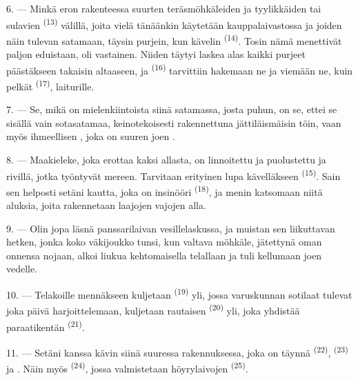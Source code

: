 6. --- Minkä eron rakenteessa suurten teräsmöhkäleiden ja tyylikkäiden
 tai sulavien 
\textsuperscript{(13)} välillä, joita vielä tänäänkin käytetään
kauppalaivastossa ja joiden näin tulevan satamaan, täysin purjein, kun kävelin
 \textsuperscript{(14)}. Tosin nämä menettivät paljon
eduistaan,   oli vastainen. Niiden täytyi laskea alas
kaikki purjeet päästäkseen takaisin altaaseen, ja 
\textsuperscript{(16)} tarvittiin hakemaan ne ja viemään ne, kuin pelkät
 \textsuperscript{(17)}, laiturille.

\VUsaut{3.0mm}
\VUsaut{3.0mm}

7. --- Se, mikä on mielenkiintoista siinä satamassa, josta puhun, on se, ettei se
sisällä vain sotasatamaa, keinotekoisesti rakennettuna jättiläismäisin töin, vaan
myös ihmeellisen , joka on suuren joen
.

8. --- Maakieleke, joka erottaa kaksi allasta, on linnoitettu ja puolustettu
 ja  rivillä, jotka työntyvät mereen.
Tarvitaan erityinen lupa kävelläkseen 
\textsuperscript{(15)}. Sain sen helposti setäni kautta, joka on insinööri
 \textsuperscript{(18)}, ja menin katsomaan niitä aluksia,
joita rakennetaan laajojen vajojen alla.

9. --- Olin jopa läsnä panssarilaivan vesillelaskussa, ja muistan sen
liikuttavan hetken, jonka koko väkijoukko tunsi, kun valtava möhkäle, jätettynä
oman onnensa nojaan, alkoi liukua kehtomaisella telallaan ja tuli kellumaan joen
vedelle.

10. --- Telakoille mennäkseen kuljetaan 
\textsuperscript{(19)} yli, jossa varuskunnan sotilaat tulevat joka päivä
harjoittelemaan, kuljetaan rautaisen 
\textsuperscript{(20)} yli, joka yhdistää paraatikentän 
\textsuperscript{(21)}.

\VUsaut{3.0mm}
\VUsaut{3.0mm}

11. --- Setäni kanssa kävin siinä suuressa rakennuksessa, joka on täynnä
 \textsuperscript{(22)}, 
\textsuperscript{(23)} ja . Näin myös
 \textsuperscript{(24)}, jossa valmistetaan
höyrylaivojen  \textsuperscript{(25)}.

